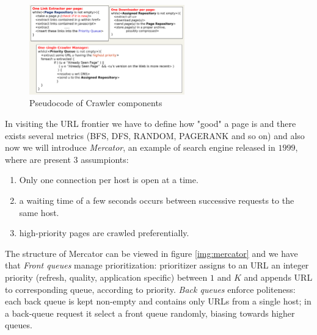 \begin{figure}
    \includegraphics[width=0.6\textwidth]{Images/crawlerPseudocode}
    \caption{Pseudocode of Crawler components}
    \label{img:crawlerAlgorithm}
\end{figure}
In visiting the URL frontier we have to define how "good" a page is and there exists several metrics (BFS, DFS, RANDOM, PAGERANK and so on) and also now
we will introduce \emph{Mercator}, an example of search engine released in $1999$, where are present $3$ assumpionts:
\begin{enumerate}
    \item Only one connection per host is open at a time.
    \item a waiting time of a few seconds occurs between successive requests to the same host.
    \item high-priority pages are crawled preferentially.
\end{enumerate}
The structure of Mercator can be viewed in figure \ref{img:mercator} and we have that \emph{Front queues} manage prioritization: prioritizer assigns to an URL an integer priority (refresh,
quality, application specific) between $1$ and $K$ and appends URL to corresponding queue, according to priority.\newline
\emph{Back queues} enforce politeness: each back queue is kept non-empty and contains only URLs from a single host; in a back-queue request it select a front queue randomly, biasing towards higher queues.

